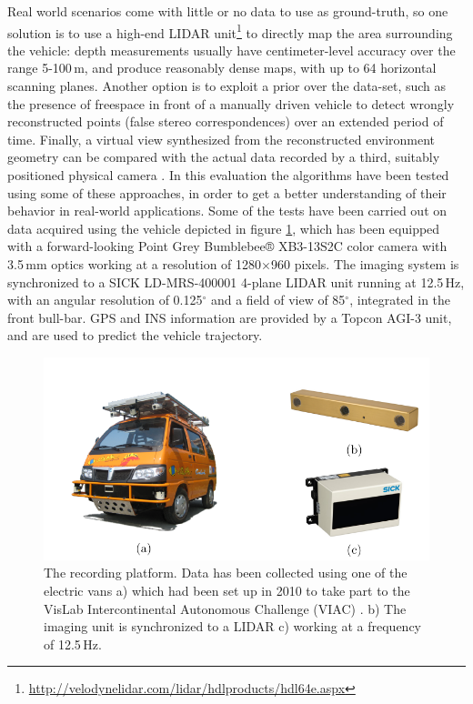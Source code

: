 Real world scenarios come with little or no data to use as ground-truth, so one solution \citep{Morales2011, Geiger2012} is to use a high-end \ac{LIDAR} unit\footnote{\url{http://velodynelidar.com/lidar/hdlproducts/hdl64e.aspx}} to directly map the area surrounding the vehicle: depth measurements usually have centimeter-level accuracy over the range 5-100\,m, and produce reasonably dense maps, with up to 64 horizontal scanning planes. Another option is to exploit a prior over the data-set, such as the presence of freespace in front of a manually driven vehicle \cite{Steingrube2009} to detect wrongly reconstructed points (false stereo correspondences) over an extended period of time. Finally, a virtual view synthesized from the reconstructed environment geometry can be compared with the actual data recorded by a third, suitably positioned physical camera \cite{Morales2011, Morales2009}.
In this evaluation the algorithms have been tested using some of these approaches, in order to get a better understanding of their behavior in real-world applications. Some of the tests have been carried out on data acquired using the vehicle depicted in figure \ref{fig:cp03_VIAC}, which has been equipped with a forward-looking Point Grey Bumblebee® XB3-13S2C color camera with 3.5\,mm optics working at a resolution of 1280$\times$960 pixels. The imaging system is synchronized to a SICK LD-MRS-400001 4-plane LIDAR unit running at 12.5\,Hz, with an angular resolution of 0.125$^\circ$ and a field of view of 85$^\circ$, integrated in the front bull-bar. GPS and INS information are provided by a Topcon AGI-3 unit, and are used to predict the vehicle trajectory.

\begin{figure}[h]
      \centering
      \includegraphics[width=\textwidth, trim=0 0 0 40,clip]{viac}
      \caption{ The recording platform. Data has been collected using one of the electric vans a) which had been set up in 2010 to take part to the VisLab Intercontinental Autonomous Challenge (VIAC) \citep{Broggi2010VIAC}. b) The imaging unit  is synchronized to a LIDAR c) working at a frequency of 12.5\,Hz. }      
      \label{fig:cp03_VIAC}
\end{figure}

